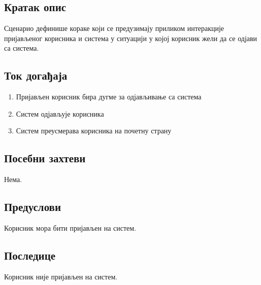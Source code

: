 \subsection{Кратак опис}
Сценарио дефинише кораке који се предузимају приликом интеракције пријављеног корисника
и система у ситуацији у којој корисник жели да се одјави са система.

\subsection{Ток догађаја}
\begin{enumerate}
    \item Пријављен корисник бира дугме за одјављивање са система
    \item Систем одјављује корисника
    \item Систем преусмерава корисника на почетну страну
\end{enumerate}


\subsection{Посебни захтеви}
Нема.

\subsection{Предуслови}
Корисник мора бити пријављен на систем.

\subsection{Последице}
Корисник није пријављен на систем.

